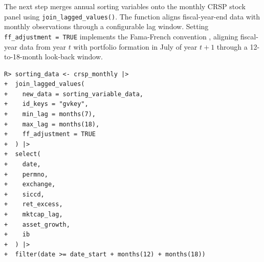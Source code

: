 \documentclass[
  article]{jss}
\begin{document}
\begin{table}


\caption{\label{tbl-ag-summary}Cross-sectional summary statistics for
asset growth (winsorized at the 1st and 99th percentiles). The `Pooled'
column reports the statistic computed on the entire firm-year sample.
The `Yearly' columns summarize the time series of statistic values
computed cross-sectionally year by year, taking the average, minimum,
and maximum across calendar years. N is the count of firm-year
observations (pooled) or per-year observations (yearly columns). Sample:
1973--2024.}

\end{table}%

The next step merges annual sorting variables onto the monthly CRSP
stock panel using \texttt{join\_lagged\_values()}. The function aligns
fiscal-year-end data with monthly observations through a configurable
lag window. Setting \texttt{ff\_adjustment\ =\ TRUE} implements the
Fama-French convention \citep{fama.1993}, aligning fiscal-year data from
year \(t\) with portfolio formation in July of year \(t+1\) through a
12-to-18-month look-back window.

\begin{verbatim}
R> sorting_data <- crsp_monthly |>
+  join_lagged_values(
+    new_data = sorting_variable_data,
+    id_keys = "gvkey",
+    min_lag = months(7),
+    max_lag = months(18),
+    ff_adjustment = TRUE
+  ) |>
+  select(
+    date,
+    permno,
+    exchange,
+    siccd,
+    ret_excess,
+    mktcap_lag,
+    asset_growth,
+    ib
+  ) |>
+  filter(date >= date_start + months(12) + months(18))
\end{verbatim}
\end{document}
